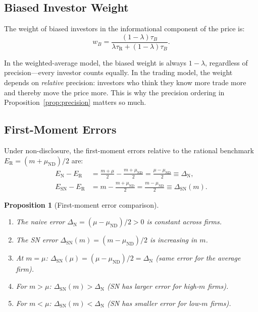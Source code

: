 \documentclass[12pt]{article}
\theoremstyle{plain}
\newtheorem{proposition}{Proposition}
\theoremstyle{definition}
\newcommand{\ND}{\mathrm{ND}}
\newcommand{\R}{\mathrm{R}}
\newcommand{\SN}{\mathrm{SN}}
\newcommand{\N}{\mathrm{N}}
\begin{document}
\subsection{Biased Investor Weight}

The weight of biased investors in the informational component of the price is:
\begin{equation}
w_B = \frac{(1-\lambda)\tau_B}{\lambda\tau_\R + (1-\lambda)\tau_B}.
\label{eq:weight}
\end{equation}

In the weighted-average model, the biased weight is always $1-\lambda$, regardless of precision---every investor counts equally. In the trading model, the weight depends on \emph{relative} precision: investors who think they know more trade more and thereby move the price more. This is why the precision ordering in Proposition~\ref{prop:precision} matters so much.


\subsection{First-Moment Errors}

Under non-disclosure, the first-moment errors relative to the rational benchmark $E_\R = (m + \mu_{\ND})/2$ are:
\begin{align}
E_\N - E_\R &= \frac{m + \mu}{2} - \frac{m + \mu_{\ND}}{2} = \frac{\mu - \mu_{\ND}}{2} \equiv \Delta_\N, \label{eq:error_naive}\\
E_\SN - E_\R &= m - \frac{m + \mu_{\ND}}{2} = \frac{m - \mu_{\ND}}{2} \equiv \Delta_\SN(m). \label{eq:error_sn}
\end{align}

\begin{proposition}[First-moment error comparison]
\label{prop:first_moment}
\hfill
\begin{enumerate}[nosep]
\item The naive error $\Delta_\N = (\mu - \mu_{\ND})/2 > 0$ is constant across firms.
\item The SN error $\Delta_\SN(m) = (m - \mu_{\ND})/2$ is increasing in $m$.
\item At $m = \mu$: $\Delta_\SN(\mu) = (\mu - \mu_{\ND})/2 = \Delta_\N$ (same error for the average firm).
\item For $m > \mu$: $\Delta_\SN(m) > \Delta_\N$ (SN has larger error for high-$m$ firms).
\item For $m < \mu$: $\Delta_\SN(m) < \Delta_\N$ (SN has smaller error for low-$m$ firms).
\end{enumerate}
\end{proposition}
\end{document}
